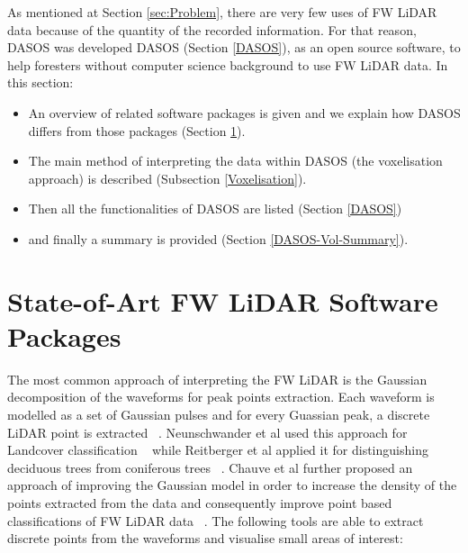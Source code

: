 \documentclass{subfiles}
\begin{document}
	
	\par As mentioned at Section \ref{sec:Problem}, there are very few uses of FW LiDAR data because of the quantity of the recorded information. For that reason, DASOS was developed DASOS (Section \ref{DASOS}), as an open source software, to help foresters without computer science background to use FW LiDAR data. In this section:
	
	\begin{itemize}
		\item An overview of related software packages is given and we explain how DASOS differs from those packages (Section \ref{LiDARsoftwares}).
		\item  The main method of interpreting the data within DASOS (the voxelisation approach) is described (Subsection \ref{Voxelisation}).
		\item Then all the functionalities of DASOS are listed (Section \ref{DASOS})
		\item and finally a summary is provided (Section \ref{DASOS-Vol-Summary}).
	\end{itemize}
	
	
	\section{State-of-Art FW LiDAR Software Packages}\label{LiDARsoftwares}
	
	\par {\color{blue}The most common approach of interpreting the FW LiDAR is the Gaussian decomposition of the waveforms for peak points extraction. Each waveform is modelled as a set of Gaussian pulses and for every Guassian peak, a discrete LiDAR point is extracted} ~\cite{Wanger2006}. Neunschwander et al used this approach for Landcover classification ~\cite{Neuenschwander2009} while Reitberger et al applied it for distinguishing deciduous trees from coniferous trees ~\cite{Reitberger2008}. Chauve et al further proposed an approach of improving the Gaussian model in order to increase the density of the points extracted from the data and consequently improve point based classifications of FW LiDAR data ~\cite{Chauve2007}.  The following tools are able to extract discrete points from the waveforms and visualise small areas of interest:
	 
\end{document}
